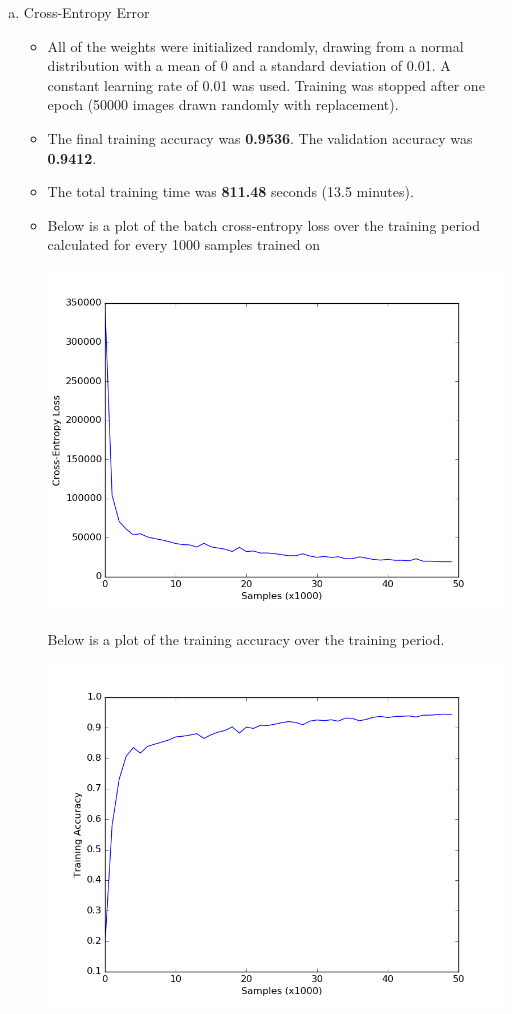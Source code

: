 \documentclass{article}
\begin{document}
\begin{enumerate}[a.]
  \item Cross-Entropy Error
    \begin{itemize}
      \item All of the weights were initialized randomly, drawing from a normal distribution with a mean of 0 and a standard deviation of 0.01. A constant learning rate of 0.01 was used. Training was stopped after one epoch (50000 images drawn randomly with replacement).
      \item The final training accuracy was \textbf{0.9536}. The validation accuracy was \textbf{0.9412}.
      \item The total training time was \textbf{811.48} seconds (13.5 minutes).
      \item Below is a plot of the batch cross-entropy loss over the training period calculated for every 1000 samples trained on
        \begin{center}
          \includegraphics[scale=0.5]{ce_loss}
        \end{center}

        Below is a plot of the training accuracy over the training period.
        \begin{center}
          \includegraphics[scale=0.5]{ce_acc}
        \end{center}
        

\end{itemize}
\end{enumerate}
\end{document}
